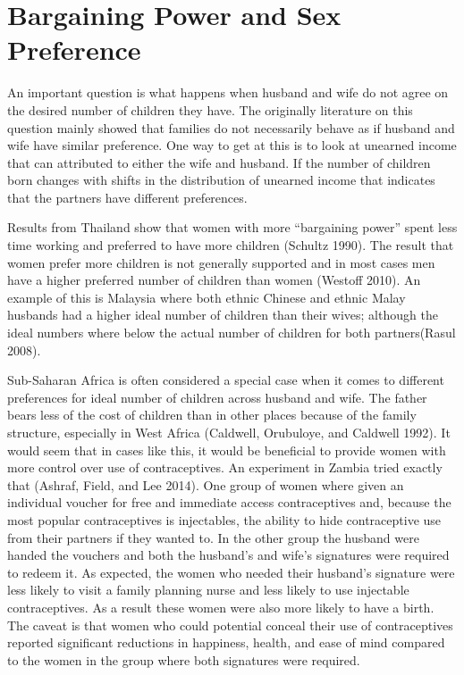 \documentclass[]{article}
\begin{document}
\section{Bargaining Power and Sex Preference}\label{bargaining-power-and-sex-preference}

An important question is what happens when husband and wife do not agree on the desired number of children they have. The originally literature on this question mainly showed that families do not necessarily behave as if husband and wife have similar preference. One way to get at this is to look at unearned income that can attributed to either the wife and husband. If the number of children born changes with shifts in the distribution of unearned income that indicates that the partners have different preferences.

Results from Thailand show that women with more ``bargaining power'' spent less time working and preferred to have more children (Schultz 1990). The result that women prefer more children is not generally supported and in most cases men have a higher preferred number of children than women (Westoff 2010). An example of this is Malaysia where both ethnic Chinese and ethnic Malay husbands had a higher ideal number of children than their wives; although the ideal numbers where below the actual number of children for both partners(Rasul 2008).

Sub-Saharan Africa is often considered a special case when it comes to different preferences for ideal number of children across husband and wife. The father bears less of the cost of children than in other places because of the family structure, especially in West Africa (Caldwell, Orubuloye, and Caldwell 1992). It would seem that in cases like this, it would be beneficial to provide women with more control over use of contraceptives. An experiment in Zambia tried exactly that (Ashraf, Field, and Lee 2014). One group of women where given an individual voucher for free and immediate access contraceptives and, because the most popular contraceptives is injectables, the ability to hide contraceptive use from their partners if they wanted to. In the other group the husband were handed the vouchers and both the husband's and wife's signatures were required to redeem it. As expected, the women who needed their husband's signature were less likely to visit a family planning nurse and less likely to use injectable contraceptives. As a result these women were also more likely to have a birth. The caveat is that women who could potential conceal their use of contraceptives reported significant reductions in happiness, health, and ease of mind compared to the women in the group where both signatures were required.
\end{document}
